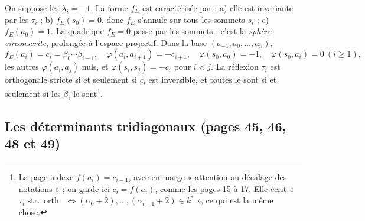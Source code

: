 \documentclass[11pt,a4paper]{article}
\begin{document}
On suppose les $\lambda_i = -1$. La forme $f_E$ est caractérisée par : a) elle
est invariante par les $\tau_i$ ; b) $f_E(s_0) = 0$, donc $f_E$ s'annule sur tous
les sommets $s_i$ ; c) $f_E(a_0) = 1$. La quadrique $f_E = 0$ passe par les
sommets : c'est la \emph{sphère circonscrite}, prolongée à l'espace projectif.
Dans la base $(a_{-1}, a_0, \ldots, a_n)$,
\[
f_E(a_i) = c_i = \beta_0 \cdots \beta_{i-1}, \quad \varphi(a_i, a_{i+1}) =
-c_{i+1}, \quad \varphi(s_0, a_0) = -1, \quad \varphi(s_0, a_i) = 0 \ (i
\geqslant 1),
\]
les autres $\varphi(a_i, a_j)$ nuls, et $\varphi(s_i, s_j) = -c_i$ pour $i <
j$. La réflexion $\tau_i$ est orthogonale stricte si et seulement si $c_i$ est
inversible, et toutes le sont si et seulement si les $\beta_i$ le
sont\footnote{La page indexe $f(a_i) = c_{i-1}$, avec en marge « attention au
décalage des notations » ; on garde ici $c_i = f(a_i)$, comme les pages 15 à
17. Elle écrit « $\tau_i$ str.\ orth.\ $\Leftrightarrow (\alpha_0 + 2), \ldots,
(\alpha_{i-1} + 2) \in k^*$ », ce qui est la même chose.}.

\subsection*{Les déterminants tridiagonaux (pages 45, 46, 48 et 49)}
\end{document}
